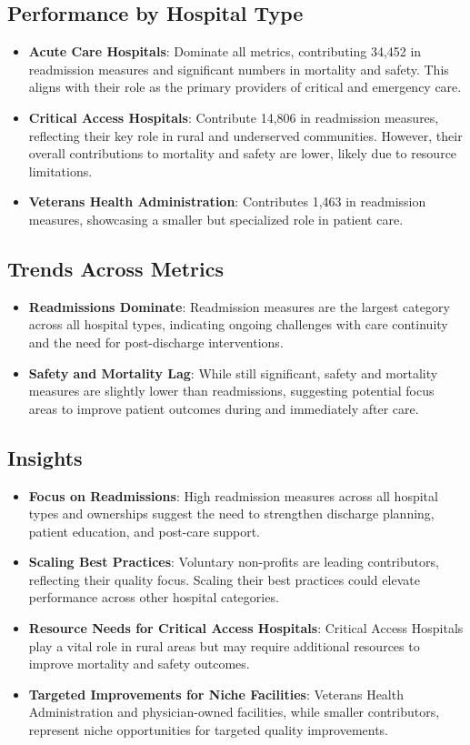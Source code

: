 \subsection{Performance by Hospital Type}
\begin{itemize}
    \item \textbf{Acute Care Hospitals}: Dominate all metrics, contributing 34,452 in readmission measures and significant numbers in mortality and safety. This aligns with their role as the primary providers of critical and emergency care.
    \item \textbf{Critical Access Hospitals}: Contribute 14,806 in readmission measures, reflecting their key role in rural and underserved communities. However, their overall contributions to mortality and safety are lower, likely due to resource limitations.
    \item \textbf{Veterans Health Administration}: Contributes 1,463 in readmission measures, showcasing a smaller but specialized role in patient care.
\end{itemize}

\subsection{Trends Across Metrics}
\begin{itemize}
    \item \textbf{Readmissions Dominate}: Readmission measures are the largest category across all hospital types, indicating ongoing challenges with care continuity and the need for post-discharge interventions.
    \item \textbf{Safety and Mortality Lag}: While still significant, safety and mortality measures are slightly lower than readmissions, suggesting potential focus areas to improve patient outcomes during and immediately after care.
\end{itemize}

\subsection{Insights}
\begin{itemize}
    \item \textbf{Focus on Readmissions}: High readmission measures across all hospital types and ownerships suggest the need to strengthen discharge planning, patient education, and post-care support.
    \item \textbf{Scaling Best Practices}: Voluntary non-profits are leading contributors, reflecting their quality focus. Scaling their best practices could elevate performance across other hospital categories.
    \item \textbf{Resource Needs for Critical Access Hospitals}: Critical Access Hospitals play a vital role in rural areas but may require additional resources to improve mortality and safety outcomes.
    \item \textbf{Targeted Improvements for Niche Facilities}: Veterans Health Administration and physician-owned facilities, while smaller contributors, represent niche opportunities for targeted quality improvements.
\end{itemize}

